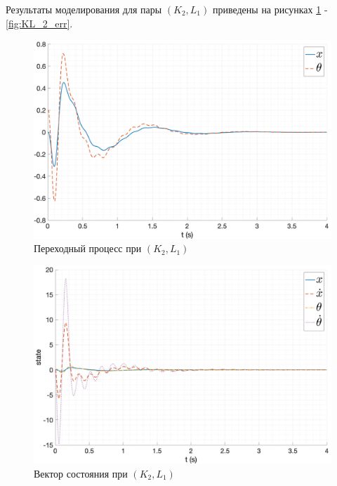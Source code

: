 Результаты моделирования для пары $(K_2, L_1)$ приведены на рисунках \ref{fig:KL_2_out} - \ref{fig:KL_2_err}.
\begin{figure}[ht!]
    \centering
    \includegraphics[width=\textwidth]{media/plots/nonmodal_observer_controller/kl_2.png}
    \caption{Переходный процесс при $(K_2, L_1)$}
    \label{fig:KL_2_out}
\end{figure}
\begin{figure}[ht!]
    \centering
    \includegraphics[width=\textwidth]{media/plots/nonmodal_observer_controller/state_2.png}
    \caption{Вектор состояния при $(K_2, L_1)$}
    \label{fig:KL_2_state}
\end{figure}
